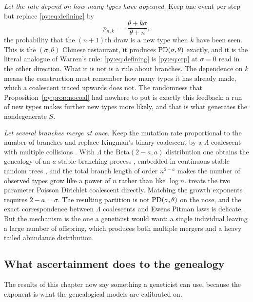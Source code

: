 \emph{Let the rate depend on how many types have appeared.} Keep one event per step but replace
\eqref{py:eq:defining} by
\begin{equation}
p_{n,k} \;=\; \frac{\theta+k\sigma}{\theta+n},
\label{py:eq:crp}
\end{equation}
the probability that the $(n+1)$th draw is a new type when $k$ have been seen. This is the
$(\sigma,\theta)$ Chinese restaurant, it produces $\mathrm{PD}(\sigma,\theta)$ exactly, and it is the
literal analogue of Warren's rule: \eqref{py:eq:defining} is \eqref{py:eq:crp} at $\sigma = 0$ read in the
other direction. What it is not is a rule about branches. The dependence on $k$ means the
construction must remember how many types it has already made, which a coalescent traced upwards
does not. The randomness that Proposition~\ref{py:prop:nocoal} had nowhere to put is exactly this
feedback: a run of new types makes further new types more likely, and that is what generates the
nondegenerate $S$.

\emph{Let several branches merge at once.} Keep the mutation rate proportional to the number of
branches and replace Kingman's binary coalescent by a $\Lambda$ coalescent with multiple collisions
\citep{py:pitman1999,py:sagitov1999}. With $\Lambda$ the $\mathrm{Beta}(2-a,a)$ distribution one obtains
the genealogy of an $a$ stable branching process \citep{py:birkner2005}, embedded in continuous stable
random trees \citep{py:berestycki2007}, and the total branch length of order $n^{2-a}$ makes the number of
observed types grow like a power of $n$ rather than like $\log n$. \citet{py:mohle2010} treats
the two parameter Poisson Dirichlet coalescent directly. Matching the growth exponents requires
$2-a = \sigma$. The resulting partition is not $\mathrm{PD}(\sigma,\theta)$ on the nose, and the exact
correspondence between $\Lambda$ coalescents and Ewens Pitman laws is delicate. But the mechanism
is the one a geneticist would want: a single individual leaving a large number of offspring, which
produces both multiple mergers and a heavy tailed abundance distribution.

\subsection{What ascertainment does to the genealogy}

The results of this chapter now say something a geneticist can use, because the exponent is what the
genealogical models are calibrated on.


